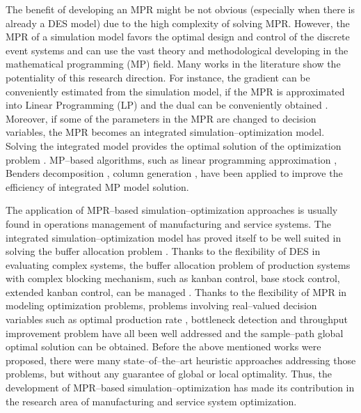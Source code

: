 \documentclass[]{interact}
\theoremstyle{plain}%
\theoremstyle{definition}
\theoremstyle{remark}
\begin{document}
The benefit of developing an MPR might be not obvious (especially when there is already a DES model) due to the high complexity of solving MPR. 
However, the MPR of a simulation model favors the optimal design and control of the discrete event systems and can use %
the vast theory and methodological developing in the mathematical programming (MP) field. Many works in the literature show the potentiality of this research direction. For instance, the gradient can be conveniently estimated from the simulation model, if the MPR is approximated into Linear Programming (LP) and %
the dual can be conveniently obtained \citep{chan2008optimization, zhang2020simulation}. Moreover, if some of the parameters in the MPR are changed to decision variables, the MPR becomes an integrated simulation--optimization model. Solving the integrated model provides the optimal solution of the optimization problem \citep{matta2008simulation}. MP--based algorithms, such as linear programming approximation \citep{alfieri2012mathematical}, Benders decomposition \citep{weiss2015buffer}, column generation \citep{alfieri2020time}, have been applied to improve the efficiency of %
integrated MP model solution. 

The application of MPR--based simulation--optimization approaches is usually found in operations management of manufacturing and service systems. The integrated simulation--optimization model has proved itself to be well suited in solving the buffer allocation problem \citep{zhang2020BAP}. %
Thanks to the flexibility of DES in evaluating complex systems, the buffer allocation problem of production systems with complex blocking mechanism, such as kanban control, base stock control, extended kanban control, can be managed \citep{pedrielli2015integrated}. Thanks to the flexibility of MPR in modeling optimization problems, problems involving real--valued decision variables such as optimal production rate \citep{tan2015mathematical}, bottleneck detection and throughput improvement problem \citep{zhang2020models} have all been well addressed and the sample--path global optimal solution can be obtained. %
Before the above mentioned works were proposed, there were many state--of--the--art heuristic approaches addressing those problems, but without any guarantee of global or local optimality. Thus, the development of MPR--based simulation--optimization has made its contribution in the research area of manufacturing and service system optimization.
\end{document}
